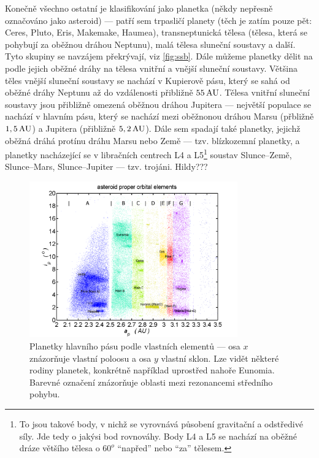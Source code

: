 \documentclass[A4paper, 12pt, oneside]{book}
\begin{document}
Konečně všechno ostatní je klasifikování jako planetka (někdy nepřesně označováno jako asteroid) --- patří sem trpasličí planety (těch je zatím pouze pět: Ceres, Pluto, Eris, Makemake, Haumea), transneptunická tělesa (tělesa, která se pohybují za oběžnou dráhou Neptunu), malá tělesa sluneční soustavy a další. Tyto skupiny se navzájem překrývají, viz \ref{fig:ssb}. Dále můžeme planetky dělit na podle jejich oběžné dráhy na tělesa vnitřní a vnější sluneční soustavy. Většina těles vnější sluneční soustavy se nachází v Kupierově pásu, který se sahá od oběžné dráhy Neptunu až do vzdálenosti přibližně $55\, {\rm AU}$. Tělesa vnitřní sluneční soustavy jsou přibližně omezená oběžnou dráhou Jupitera --- největší populace se nachází v hlavním pásu, který se nachází mezi oběžnonou dráhou Marsu (přbližně $1,5\, {\rm AU}$) a Jupitera (přibližně $5,2\, {\rm AU}$). Dále sem spadají také planetky, jejichž oběžná dráhá protínu dráhu Marsu nebo Země --- tzv. blízkozemní planetky, a planetky nacházející se v libračních centrech L4 a L5\footnote{To jsou takové body, v nichž se vyrovnává působení gravitační a odstředivé síly. Jde tedy o jakýsi bod rovnováhy. Body L4 a L5 se nachází na oběžné dráze většího tělesa o $60^o$ \enquote{napřed} nebo \enquote{za} tělesem.} soustav Slunce--Země, Slunce--Mars, Slunce--Jupiter --- tzv. trojáni. Hildy???

\begin{figure}[!htb]
	\centering
	\includegraphics[width=0.8\textwidth]{obr/mainbelt.png}
	\caption{Planetky hlavního pásu podle vlastních elementů --- osa $x$ znázorňuje vlastní poloosu a osa $y$ vlastní sklon. Lze vidět některé rodiny planetek, konkrétně například uprostřed nahoře Eunomia. Barevné označení znázorňuje oblasti mezi rezonancemi středního pohybu.} \label{fig:belt}
\end{figure}
\end{document}

